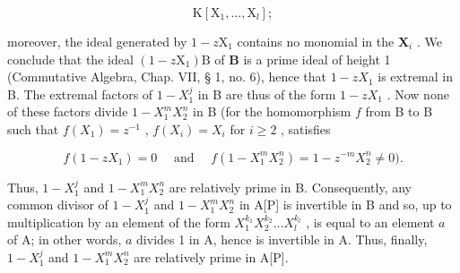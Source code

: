 \[
\mathrm{K} \left[ \mathrm{X} _ {1}, \dots , \mathrm{X} _ {l} \right];
\]

moreover, the ideal generated by \(1 - z\mathrm{X}_1\) contains no monomial in the \(\mathbf{X}_i\) . We conclude that the ideal \((1 - z\mathrm{X}_1)\mathrm{B}\) of \(\mathbf{B}\) is a prime ideal of height 1 (Commutative Algebra, Chap. VII, § 1, no. 6), hence that \(1 - zX_{1}\) is extremal in B. The extremal factors of \(1 - X_{1}^{j}\) in B are thus of the form \(1 - zX_{1}\) . Now none of these factors divide \(1 - X_{1}^{m}X_{2}^{n}\) in B (for the homomorphism \(f\) from B to B such that \(f(X_{1}) = z^{-1}\) , \(f(X_{i}) = X_{i}\) for \(i \geqslant 2\) , satisfies

\[
f (1 - z X _ {1}) = 0 \quad \text { and } \quad f (1 - X _ {1} ^ {m} X _ {2} ^ {n}) = 1 - z ^ {- m} X _ {2} ^ {n} \neq 0).
\]

Thus, \(1 - X_1^j\) and \(1 - X_1^m X_2^n\) are relatively prime in B. Consequently, any common divisor of \(1 - X_1^j\) and \(1 - X_1^m X_2^n\) in A{[}P{]} is invertible in B and so, up to multiplication by an element of the form \(X_1^{k_1}X_2^{k_2}\ldots X_l^{k_l}\) , is equal to an element \(a\) of A; in other words, \(a\) divides 1 in A, hence is invertible in A. Thus, finally, \(1 - X_1^j\) and \(1 - X_1^m X_2^n\) are relatively prime in A{[}P{]}.

